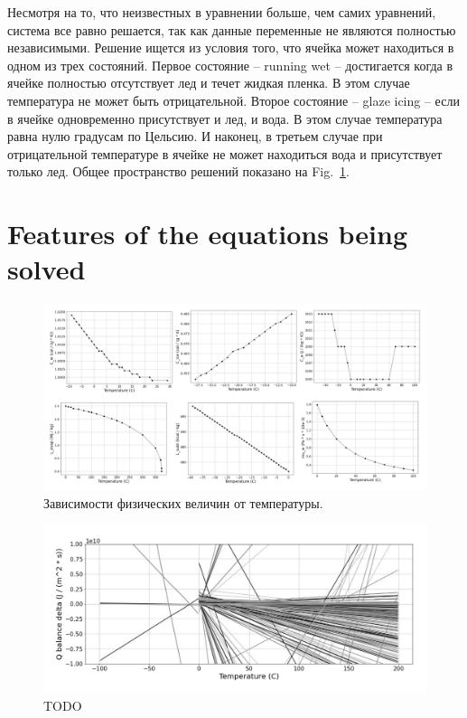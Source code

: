 \documentclass[
11pt,%
tightenlines,%
twoside,%
onecolumn,%
nofloats,%
nobibnotes,%
nofootinbib,%
superscriptaddress,%
noshowpacs,%
centertags]%
{revtex4}
\begin{document}
Несмотря на то, что неизвестных в уравнении больше, чем самих уравнений, система все равно решается, так как данные переменные не являются полностью независимыми.
Решение ищется из условия того, что ячейка может находиться в одном из трех состояний.
Первое состояние -- running wet -- достигается когда в ячейке полностью отсутствует лед и течет жидкая пленка.
В этом случае температура не может быть отрицательной.
Второе состояние -- glaze icing -- если в ячейке одновременно присутствует и лед, и вода.
В этом случае температура равна нулю градусам по Цельсию.
И наконец, в третьем случае при отрицательной температуре в ячейке не может находиться вода и присутствует только лед.
Общее пространство решений показано на Fig.~\ref{fig:surface}.

\section{Features of the equations being solved}

\begin{figure}[h]
\setcaptionmargin{5mm}
\onelinecaptionstrue
\includegraphics[width=1.0\textwidth]{pics/ph_graphics_h.pdf}
\caption{Зависимости физических величин от температуры.}\label{fig:surface}
\end{figure}

\begin{figure}[h]
\setcaptionmargin{5mm}
\onelinecaptionstrue
\includegraphics[width=1.0\textwidth]{pics/dq.pdf}
\caption{TODO}\label{fig:dq}
\end{figure}
\end{document}
